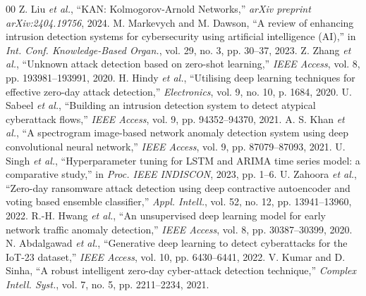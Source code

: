 \documentclass[conference]{IEEEtran}
\begin{document}
\begin{thebibliography}{00}
 Z. Liu \textit{et al.}, ``KAN: Kolmogorov-Arnold Networks,'' \textit{arXiv preprint arXiv:2404.19756}, 2024.
 M. Markevych and M. Dawson, ``A review of enhancing intrusion detection systems for cybersecurity using artificial intelligence (AI),'' in \textit{Int. Conf. Knowledge-Based Organ.}, vol. 29, no. 3, pp. 30--37, 2023.
 Z. Zhang \textit{et al.}, ``Unknown attack detection based on zero-shot learning,'' \textit{IEEE Access}, vol. 8, pp. 193981--193991, 2020.
 H. Hindy \textit{et al.}, ``Utilising deep learning techniques for effective zero-day attack detection,'' \textit{Electronics}, vol. 9, no. 10, p. 1684, 2020.
 U. Sabeel \textit{et al.}, ``Building an intrusion detection system to detect atypical cyberattack flows,'' \textit{IEEE Access}, vol. 9, pp. 94352--94370, 2021.
 A. S. Khan \textit{et al.}, ``A spectrogram image-based network anomaly detection system using deep convolutional neural network,'' \textit{IEEE Access}, vol. 9, pp. 87079--87093, 2021.
 U. Singh \textit{et al.}, ``Hyperparameter tuning for LSTM and ARIMA time series model: a comparative study,'' in \textit{Proc. IEEE INDISCON}, 2023, pp. 1--6.
 U. Zahoora \textit{et al.}, ``Zero-day ransomware attack detection using deep contractive autoencoder and voting based ensemble classifier,'' \textit{Appl. Intell.}, vol. 52, no. 12, pp. 13941--13960, 2022.
 R.-H. Hwang \textit{et al.}, ``An unsupervised deep learning model for early network traffic anomaly detection,'' \textit{IEEE Access}, vol. 8, pp. 30387--30399, 2020.
 N. Abdalgawad \textit{et al.}, ``Generative deep learning to detect cyberattacks for the IoT-23 dataset,'' \textit{IEEE Access}, vol. 10, pp. 6430--6441, 2022.
 V. Kumar and D. Sinha, ``A robust intelligent zero-day cyber-attack detection technique,'' \textit{Complex Intell. Syst.}, vol. 7, no. 5, pp. 2211--2234, 2021.
\end{thebibliography}
\end{document}
